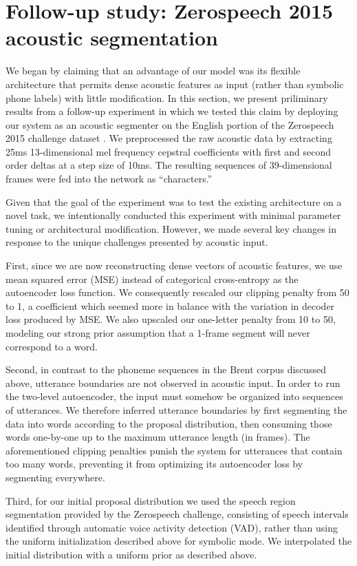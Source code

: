 \documentclass[11pt,letterpaper]{article}
\begin{document}
\section{Follow-up study: Zerospeech 2015 acoustic segmentation}

We began by claiming that an advantage of our model was its flexible architecture that permits dense acoustic features as input (rather than symbolic phone labels) with little modification.
In this section, we present priliminary results from a follow-up experiment in which we tested this claim by deploying our system as an acoustic segmenter on the English portion of the Zerospeech 2015 challenge dataset \cite{Versteegh15}.
We preprocessed the raw acoustic data by extracting 25ms 13-dimensional mel frequency cepstral coefficients with first and second order deltas at a step size of 10ms.
The resulting sequences of 39-dimensional frames were fed into the network as ``characters.''

Given that the goal of the experiment was to test the existing architecture on a novel task, we intentionally conducted this experiment with minimal parameter tuning or architectural modification.
However, we made several key changes in response to the unique challenges presented by acoustic input.

First, since we are now reconstructing dense vectors of acoustic features, we use mean squared error (MSE) instead of categorical cross-entropy as the autoencoder loss function.
We consequently rescaled our clipping penalty from 50 to 1, a coefficient which seemed more in balance with the variation in decoder loss produced by MSE.
We also upscaled our one-letter penalty from 10 to 50, modeling our strong prior assumption that a 1-frame segment will never correspond to a word.

Second, in contrast to the phoneme sequences in the Brent corpus discussed above, utterance boundaries are not observed in acoustic input.
In order to run the two-level autoencoder, the input must somehow be organized into sequences of utterances.
We therefore inferred utterance boundaries by first segmenting the data into words according to the proposal distribution, then consuming those words one-by-one up to the maximum utterance length (in frames).
The aforementioned clipping penalties punish the system for utterances that contain too many words, preventing it from optimizing its autoencoder loss by segmenting everywhere.

Third, for our initial proposal distribution we used the speech region segmentation provided by the Zerospeech challenge, consisting of speech intervals identified through automatic voice activity detection (VAD), rather than using the uniform initialization described above for symbolic mode.
We interpolated the initial distribution with a uniform prior as described above.
\end{document}
